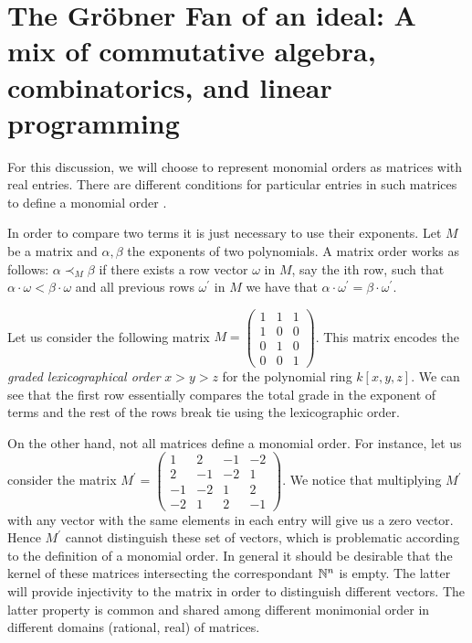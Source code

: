 \section{The Gr\"obner Fan of an ideal: A mix of commutative algebra,
  combinatorics, and linear programming}

For this discussion, we will choose to represent monomial orders as matrices with
real entries. There are different conditions for particular entries in such matrices
to define a monomial order \cite{Cox:2014}.

In order to compare two terms it is just necessary to use their exponents. Let $M$
be a matrix and $\alpha, \beta$ the exponents of two polynomials.
A matrix order works as follows: $\alpha \prec_M \beta$
if there exists a row vector $\omega$ in $M$, say the ith row, such that
$\alpha \cdot \omega < \beta \cdot \omega$ and all previous rows $\omega^{'}$ in $M$
we have that $\alpha \cdot \omega^{'} = \beta \cdot \omega^{'}$.

\begin{example} Let us consider the following matrix
  $M = \begin{pmatrix} 1 & 1 & 1 \\
    1 & 0 & 0 \\
    0 & 1 & 0 \\
    0 & 0 & 1 \end{pmatrix}$. This matrix encodes the \emph{graded lexicographical
    order} $x > y > z$ for the polynomial ring $k[x, y, z]$. We can see that the first row
  essentially compares the total grade in the exponent of terms and the rest
  of the rows break tie using the lexicographic order.
\end{example}

\begin{example}
  On the other hand, not all matrices define a monomial order. For instance, let
  us consider the matrix $M^{'} = \begin{pmatrix} 1 & 2 & -1 & -2 \\
    2 & -1 & -2 & 1 \\
    -1 & -2 & 1 & 2 \\
    -2 & 1 & 2 & -1
  \end{pmatrix}$. We notice that multiplying $M^{'}$ with any vector with the same elements in each
  entry will give us a zero vector. Hence $M^{'}$ cannot distinguish
  these set of vectors, which is problematic according to the definition
  of a monomial order. In general it should be desirable that the kernel
  of these matrices intersecting the correspondant $\mathbb{N}^n$ is empty.
  The latter will provide injectivity to the matrix in order to distinguish
  different vectors. The latter property is common and shared among different
  monimonial order in different domains (rational, real) of matrices.
\end{example}

